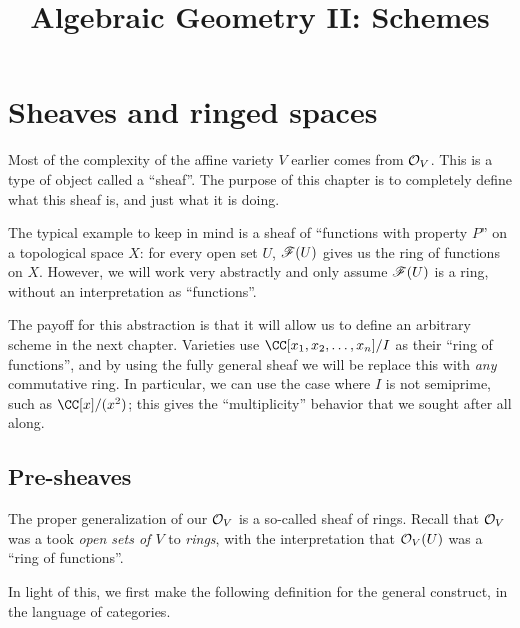 \documentclass[11pt]{scrreprt}
\begin{document}
\title{Algebraic Geometry II: Schemes}
\maketitle

\tableofcontents

\chapter{Sheaves and ringed spaces}
Most of the complexity of the affine variety $V$ earlier comes from $\mathcal O_V$.
This is a type of object called a ``sheaf''.
The purpose of this chapter is to completely define what this sheaf is,
and just what it is doing.

The typical example to keep in mind is a sheaf of
``functions with property $P$'' on a topological space $X$:
for every open set $U$, $\mathscr F(U)$ gives us the ring of functions on $X$.
However, we will work very abstractly and only assume $\mathscr F(U)$
is a ring, without an interpretation as ``functions''.

The payoff for this abstraction is that it will
allow us to define an arbitrary scheme in the next chapter.
Varieties use $\CC[x_1, x_2, \dots, x_n] / I$ as their ``ring of functions'',
and by using the fully general sheaf we will be replace this
with \emph{any} commutative ring.
In particular, we can use the case where $I$ is not semiprime, such as
$\CC[x] / (x^2)$; this gives the ``multiplicity''
behavior that we sought after all along.  

\section{Pre-sheaves}

The proper generalization of our $\mathcal O_V$ is a so-called sheaf of rings.
Recall that $\mathcal O_V$ was a took \emph{open sets of $V$} to \emph{rings},
with the interpretation that $\mathcal O_V(U)$ was a ``ring of functions''.

In light of this, we first make the following definition
for the general construct, in the language of categories.
\end{document}
